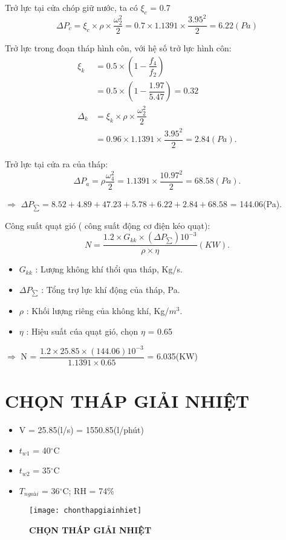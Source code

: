 Trở lực tại cửa chóp giữ nước, ta có $\xi_{c}$ = 0.7
\begin{equation*}
	\Delta P_{c} = \xi_{c} \times \rho \times  
	\dfrac{\omega_{2}^2}{2} = 0.7 \times 1.1391 \times \dfrac{3.95^2}{2} = 6.22(Pa)
\end{equation*}

\newpage

Trở lực trong đoạn tháp hình côn, với hệ số trở lực hình côn:
\begin{equation*}
	\begin{split}
		\xi_{k}& = 0.5 \times (1 - \dfrac{f_{4}}{f_{2}})\\
			& = 0.5 \times (1 - \dfrac{1.97}{5.47}) = 0.32\\
		\Delta_{k}& = \xi_{k} \times \rho \times \dfrac{\omega_{2}^2}{2}	\\
				  & = 0.96 \times 1.1391 \times \dfrac{3.95^2}{2} = 2.84(Pa).		 		
	\end{split}
\end{equation*}

Trở lực tại cửa ra của tháp:
\begin{equation*}
	\Delta P_{a} = \rho \dfrac{\omega_{4}^2}{2} = 1.1391 \times \dfrac{10.97^2}{2} = 68.58(Pa).
\end{equation*}

$\Rightarrow$ $\Delta P_{\sum} = 8.52 + 4.89 + 47.23 + 5.78 + 6.22 + 2.84 + 68.58$ = 144.06(Pa).

Công suất quạt gió ( công suất động cơ điện kéo quạt):
\begin{equation*}
	N = \dfrac{1.2 \times G_{kk} \times (\Delta P_{\sum}) 10^{-3}}{\rho \times \eta } (KW).
\end{equation*}

\begin{itemize}
	\item $G_{kk}$ : Lượng không khí thổi qua tháp, Kg/s.
	\item $\Delta P_{\sum}$ : Tổng trợ lực khí động của tháp, Pa.
	\item $\rho$ : Khối lượng riêng của không khí, Kg/$m^3$. 
	\item $\eta$ : Hiệu suất cúa quạt gió, chọn $\eta$ = 0.65
\end{itemize}

$\Rightarrow$ N = $\dfrac{1.2 \times 25.85 \times (144.06)10^{-3}}{1.1391 \times 0.65}$ = 6.035(KW)

\section{CHỌN THÁP GIẢI NHIỆT}
\begin{itemize}
	\item V = 25.85(l/s) = 1550.85(l/phút)
	\item $t_{w1}$ = 40$^{\circ}$C
	\item $t_{w2}$ = 35$^{\circ}$C
	\item $T_{ngoài}$ = 36$^{\circ}$C; RH = 74\%
\end{itemize}

\newpage
\begin{figure}[H]
	\centering
	\texttt{[image: chonthapgiainhiet]}
	\caption{\textbf{CHỌN THÁP GIẢI NHIỆT}}
	\label{chonthapgiainhiet}
\end{figure}
